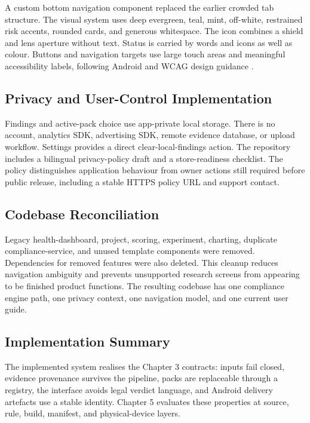 A custom bottom navigation component replaced the earlier crowded tab structure. The visual system uses deep evergreen, teal, mint, off-white, restrained risk accents, rounded cards, and generous whitespace. The icon combines a shield and lens aperture without text. Status is carried by words and icons as well as colour. Buttons and navigation targets use large touch areas and meaningful accessibility labels, following Android and WCAG design guidance \cite{androidaccess,wcag22}.

\subsection{Privacy and User-Control Implementation}

Findings and active-pack choice use app-private local storage. There is no account, analytics SDK, advertising SDK, remote evidence database, or upload workflow. Settings provides a direct clear-local-findings action. The repository includes a bilingual privacy-policy draft and a store-readiness checklist. The policy distinguishes application behaviour from owner actions still required before public release, including a stable HTTPS policy URL and support contact.

\subsection{Codebase Reconciliation}

Legacy health-dashboard, project, scoring, experiment, charting, duplicate compliance-service, and unused template components were removed. Dependencies for removed features were also deleted. This cleanup reduces navigation ambiguity and prevents unsupported research screens from appearing to be finished product functions. The resulting codebase has one compliance engine path, one privacy context, one navigation model, and one current user guide.

\subsection{Implementation Summary}

The implemented system realises the Chapter 3 contracts: inputs fail closed, evidence provenance survives the pipeline, packs are replaceable through a registry, the interface avoids legal verdict language, and Android delivery artefacts use a stable identity. Chapter 5 evaluates these properties at source, rule, build, manifest, and physical-device layers.
